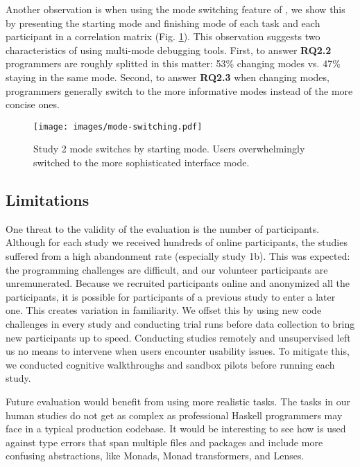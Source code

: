 Another observation is when using the mode switching feature of \chameleon{}, we show this by presenting the starting mode and finishing mode of each task and each participant in a correlation matrix (Fig. \ref{fig:r4-mode-switching}). This observation suggests two characteristics of using multi-mode debugging tools. First, to answer \textbf{RQ2.2} programmers are roughly splitted in this matter: 53\% changing modes vs. 47\% staying in the same mode. Second, to answer \textbf{RQ2.3} when changing modes, programmers generally switch to the more informative modes instead of the more concise ones.

\begin{figure}[ht]
    \centering
    \texttt{[image: images/mode-switching.pdf]}
    \caption{Study 2 mode switches by starting mode.  Users overwhelmingly switched to the more sophisticated interface mode.
    }
    \label{fig:r4-mode-switching}
\end{figure}


\subsection{Limitations}

One threat to the validity of the evaluation is the number of participants. Although for each study we received hundreds of online participants, the studies suffered from a high abandonment rate (especially study 1b). This was expected: the programming challenges are difficult, and our volunteer participants are unremunerated. 
Because we recruited participants online and anonymized all the participants, it is possible for participants of a previous study to enter a later one. This creates variation in familiarity. We offset this by using new code challenges in every study and conducting trial runs before data collection to bring new participants up to speed.
Conducting studies remotely and unsupervised left us no means to intervene when users encounter usability issues. To mitigate this, we conducted cognitive walkthroughs and sandbox pilots before running each study.

Future evaluation would benefit from using more realistic tasks. The tasks in our human studies do not get as complex as professional Haskell programmers may face in a typical production codebase. It would be interesting to see how \chameleon{} is used against type errors that span multiple files and packages and include more confusing abstractions, like Monads, Monad transformers, and Lenses.
